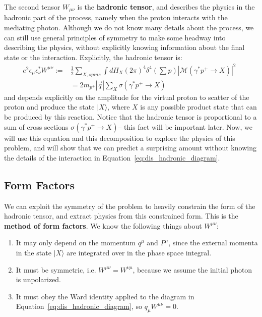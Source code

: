 \documentclass[11pt, oneside]{article}   	%
\theoremstyle{definition}
\begin{document}
The second tensor $W_{\mu\nu}$ is the \textbf{hadronic tensor}, and describes the physics in the hadronic part of the process, 
namely when the proton interacts with the mediating photon. Although we do not know many details about the process, we can still 
use general principles of symmetry to make some headway into describing the physics, without explicitly knowing information 
about the final state or the interaction. Explicitly, the hadronic tensor is:
\begin{align}
	e^2\epsilon_\mu\epsilon_\nu^* W^{\mu\nu} :=& \frac{1}{2}\sum_{X, spins} \int d\Pi_X (2\pi)^4\delta^4\left(\sum p\right)
	|\mathcal M(\gamma^*p^+\rightarrow X)|^2~
	\label{eq:hadronic_tensor}~
	\\
	& = 2m_{p^+}|\vec q|\sum_X \sigma(\gamma^*p^+\rightarrow X)~
	\label{eq:hadronic_tensor_cross}
\end{align}
and depends explicitly on the amplitude for the virtual proton to scatter of the proton and produce the state $|X\rangle$, where $X$ 
is any possible product state that can be produced by this reaction. Notice that the hadronic tensor is proportional to a sum of cross 
sections $\sigma(\gamma^* p^+\rightarrow X)$-- this fact will be important later. Now, we will use this equation and this 
decomposition to explore the physics of this problem, and will show that we can predict a surprising amount without knowing 
the details of the interaction in Equation~\ref{eq:dis_hadronic_diagram}.

\subsection{Form Factors}

We can exploit the symmetry of the problem to heavily constrain the form of the hadronic tensor, and 
extract physics from this constrained form. This is the \textbf{method of form factors}. We know the following things about 
$W^{\mu\nu}$:
\begin{enumerate}
	\item It may only depend on the momentum $q^\mu$ and $P^\mu$, since the external momenta in the state $|X\rangle$ are 
	integrated over in the phase space integral. 
	\item It must be symmetric, i.e. $W^{\mu\nu} = W^{\nu\mu}$, because we assume the initial photon is unpolarized. 
	\item It must obey the Ward identity applied to the diagram in Equation~\ref{eq:dis_hadronic_diagram}, so $q_\mu W^{\mu\nu} = 0$. 
\end{enumerate}
\end{document}
